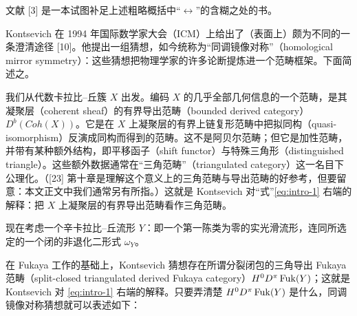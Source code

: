 
文献 [3] 是一本试图补足上述粗略概括中“$\leftrightarrow$”的含糊之处的书。

Kontsevich 在 1994 年国际数学家大会（ICM）上给出了（表面上）颇为不同的一条澄清途径 [10]。他提出一组猜想，如今统称为“同调镜像对称”（homological mirror symmetry）：这些猜想把物理学家的许多论断提炼进一个范畴框架。下面简述之。

我们从代数卡拉比–丘簇 $X$ 出发。编码 $X$ 的几乎全部几何信息的一个范畴，是其凝聚层（coherent sheaf）的有界导出范畴（bounded derived category）$D^b(Coh(X))$。它是在 $X$ 上凝聚层的有界上链复形范畴中把拟同构（quasi-isomorphism）反演成同构而得到的范畴。这不是阿贝尔范畴；但它是加性范畴，并带有某种额外结构，即平移函子（shift functor）与特殊三角形（distinguished triangle）。这些额外数据通常在“三角范畴”（triangulated category）这一名目下公理化。（[23] 第十章是理解这个意义上的三角范畴与导出范畴的好参考，但要留意：本文正文中我们通常另有所指。）这就是 Kontsevich 对“式”\eqref{eq:intro-1} 右端的解释：把 $X$ 上凝聚层的有界导出范畴看作三角范畴。



现在考虑一个辛卡拉比–丘流形 $Y$：即一个第一陈类为零的实光滑流形，连同所选定的一个闭的非退化二形式 $\omega_Y$。


在 Fukaya 工作的基础上，Kontsevich 猜想存在所谓分裂闭包的三角导出 Fukaya 范畴（split-closed triangulated derived Fukaya category）$H^0D^\pi\operatorname{Fuk}(Y)$；这就是 Kontsevich 对 \eqref{eq:intro-1} 右端的解释。只要弄清楚 $H^0D^\pi\operatorname{Fuk}(Y)$ 是什么，同调镜像对称猜想就可以表述如下：

